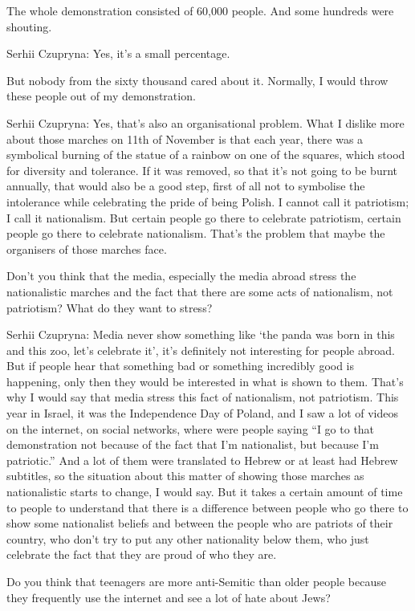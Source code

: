 The whole demonstration consisted of 60,000 people. And some hundreds were shouting. 

Serhii Czupryna: Yes, it’s a small percentage.  

But nobody from the sixty thousand cared about it. Normally, I would throw these people out of my demonstration. 

Serhii Czupryna: Yes, that’s also an organisational problem. What I dislike more about those marches on 11th of November is that each year, there was a symbolical burning of the statue of a rainbow on one of the squares, which stood for diversity and tolerance. If it was removed, so that it’s not going to be burnt annually, that would also be a good step, first of all not to symbolise the intolerance while celebrating the pride of being Polish. I cannot call it patriotism; I call it nationalism. But certain people go there to celebrate patriotism, certain people go there to celebrate nationalism. That’s the problem that maybe the organisers of those marches face. 

Don’t you think that the media, especially the media abroad stress the nationalistic marches and the fact that there are some acts of nationalism, not patriotism? What do they want to stress?  

Serhii Czupryna: Media never show something like ‘the panda was born in this and this zoo, let’s celebrate it’, it’s definitely not interesting for people abroad. But if people hear that something bad or something incredibly good is happening, only then they would be interested in what is shown to them. That’s why I would say that media stress this fact of nationalism, not patriotism. This year in Israel, it was the Independence Day of Poland, and I saw a lot of videos on the internet, on social networks, where were people saying “I go to that demonstration not because of the fact that I’m nationalist, but because I’m patriotic.” And a lot of them were translated to Hebrew or at least had Hebrew subtitles, so the situation about this matter of showing those marches as nationalistic starts to change, I would say. But it takes a certain amount of time to people to understand that there is a difference between people who go there to show some nationalist beliefs and between the people who are patriots of their country, who don’t try to put any other nationality below them, who just celebrate the fact that they are proud of who they are.  

Do you think that teenagers are more anti-Semitic than older people because they frequently use the internet and see a lot of hate about Jews? 

